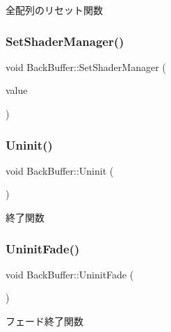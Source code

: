 全配列のリセット関数 

\mbox{\label{class_back_buffer_a44566449a4df988cb1cfe5ffbb0455cc}} 
\subsubsection{\texorpdfstring{Set\+Shader\+Manager()}{SetShaderManager()}}
{\footnotesize\ttfamily void Back\+Buffer\+::\+Set\+Shader\+Manager (\begin{DoxyParamCaption}\item[{\mbox{\hyperlink{class_shader_manager}{Shader\+Manager}} $\ast$}]{value }\end{DoxyParamCaption})\hspace{0.3cm}{\ttfamily [inline]}}

\mbox{\label{class_back_buffer_a18f0eebb58ad22bc0514edddf966eea7}} 
\subsubsection{\texorpdfstring{Uninit()}{Uninit()}}
{\footnotesize\ttfamily void Back\+Buffer\+::\+Uninit (\begin{DoxyParamCaption}{ }\end{DoxyParamCaption})}



終了関数 

\mbox{\label{class_back_buffer_ad3d3626427f53f060f5057ea6a22cac6}} 
\subsubsection{\texorpdfstring{Uninit\+Fade()}{UninitFade()}}
{\footnotesize\ttfamily void Back\+Buffer\+::\+Uninit\+Fade (\begin{DoxyParamCaption}{ }\end{DoxyParamCaption})}



フェード終了関数 


